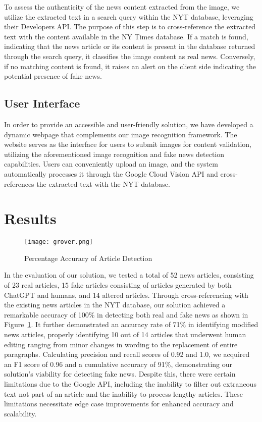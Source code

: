 \documentclass[conference]{IEEEtran}
\begin{document}
To assess the authenticity of the news content extracted from the image, we utilize the extracted text in a search query within the NYT database, leveraging their Developers API. The purpose of this step is to cross-reference the extracted text with the content available in the NY Times database. If a match is found, indicating that the news article or its content is present in the database returned through the search query, it classifies the image content as real news. Conversely, if no matching content is found, it raises an alert on the client side indicating the potential presence of fake news.

\subsection{User Interface}

In order to provide an accessible and user-friendly solution, we have developed a dynamic webpage that complements our image recognition framework. The website serves as the interface for users to submit images for content validation, utilizing the aforementioned image recognition and fake news detection capabilities. Users can conveniently upload an image, and the system automatically processes it through the Google Cloud Vision API and cross-references the extracted text with the NYT database.

\section{Results}

\begin{figure}
\centering
    \texttt{[image: grover.png]}
    \caption{Percentage Accuracy of Article Detection}
\label{fig:fakenews1}
\end{figure}

In the evaluation of our solution, we tested a total of 52 news articles, consisting of 23 real articles, 15 fake articles consisting of articles generated by both ChatGPT and humans, and 14 altered articles. Through cross-referencing with the existing news articles in the NYT database, our solution achieved a remarkable accuracy of 100\% in detecting both real and fake news as shown in Figure~\ref{fig:fakenews1}. It further demonstrated an accuracy rate of 71\% in identifying modified news articles, properly identifying 10 out of 14 articles that underwent human editing ranging from minor changes in wording to the replacement of entire paragraphs. Calculating precision and recall scores of 0.92 and 1.0, we acquired an F1 score of 0.96 and a cumulative accuracy of 91\%, demonstrating our solution's viability for detecting fake news. Despite this, there were certain limitations due to the Google API, including the inability to filter out extraneous text not part of an article and the inability to process lengthy articles. These limitations necessitate edge case improvements for enhanced accuracy and scalability.
\end{document}

